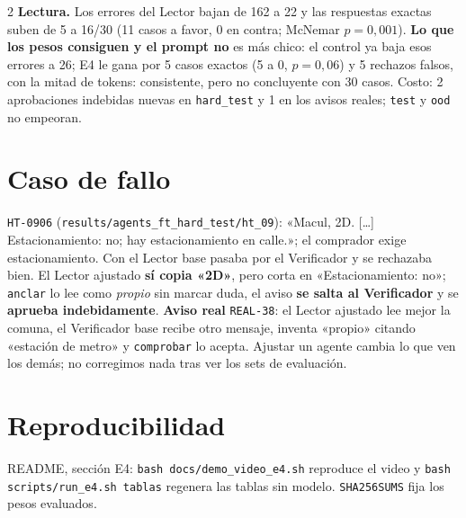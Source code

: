 \documentclass[9pt,a4paper]{extarticle}
\newcommand{\cod}[1]{\texttt{#1}}
\begin{document}
\begin{multicols}{2}
\textbf{Lectura.} Los errores del Lector bajan de 162 a 22 y las respuestas exactas suben de 5 a 16/30 (11 casos a favor, 0 en contra; McNemar $p{=}0{,}001$). \textbf{Lo que los pesos consiguen y el prompt no} es más chico: el control ya baja esos errores a 26; E4 le gana por 5 casos exactos (5 a 0, $p{=}0{,}06$) y 5 rechazos falsos, con la mitad de tokens: consistente, pero no concluyente con 30 casos. Costo: 2 aprobaciones indebidas nuevas en \cod{hard\_test} y 1 en los avisos reales; \cod{test} y \cod{ood} no empeoran.

\section{Caso de fallo}
\cod{HT-0906} (\cod{results/agents\_ft\_hard\_test/ht\_09}): «Macul, 2D. [\dots] Estacionamiento: no; hay estacionamiento en calle.»; el comprador exige estacionamiento. Con el Lector base pasaba por el Verificador y se rechazaba bien. El Lector ajustado \textbf{sí copia «2D»}, pero corta en «Estacionamiento: no»; \cod{anclar} lo lee como \emph{propio} sin marcar duda, el aviso \textbf{se salta al Verificador} y se \textbf{aprueba indebidamente}. \textbf{Aviso real} \cod{REAL-38}: el Lector ajustado lee mejor la comuna, el Verificador base recibe otro mensaje, inventa «propio» citando «estación de metro» y \cod{comprobar} lo acepta. Ajustar un agente cambia lo que ven los demás; no corregimos nada tras ver los sets de evaluación.

\section{Reproducibilidad}
README, sección E4: \cod{bash docs/demo\_video\_e4.sh} reproduce el video y \cod{bash scripts/run\_e4.sh tablas} regenera las tablas sin modelo. \cod{SHA256SUMS} fija los pesos evaluados.
\end{multicols}
\end{document}
